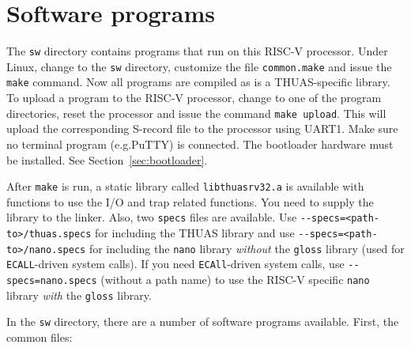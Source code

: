 \documentclass[12pt]{article}
\begin{document}

\section{Software programs}
The \lstinline|sw| directory contains programs that run on this RISC-V processor. Under Linux, change to the \lstinline|sw| directory, customize the file \lstinline|common.make| and issue the \lstinline|make| command. Now all programs are compiled as is a THUAS-specific library. To upload a program to the RISC-V processor, change to one of the program directories, reset the processor and issue the command \lstinline|make upload|. This will upload the corresponding S-record file to the processor using UART1. Make sure no terminal program (e.g.\@ PuTTY) is connected. The bootloader hardware must be installed. See Section~\ref{sec:bootloader}.

After \lstinline|make| is run, a static library called \lstinline|libthuasrv32.a| is available with functions to use the I/O and trap related functions. You need to supply the library to the linker. Also, two \lstinline|specs| files are available. Use \lstinline|--specs=<path-to>/thuas.specs| for including the THUAS library and use \lstinline|--specs=<path-to>/nano.specs| for including the \lstinline|nano| library \textsl{without} the \lstinline|gloss| library (used for \lstinline|ECALL|-driven system calls). If you need \lstinline|ECAll|-driven system calls, use \lstinline|--specs=nano.specs| (without a path name) to use the RISC-V specific \lstinline|nano| library \textsl{with} the \lstinline|gloss| library.

In the \lstinline|sw| directory, there are a number of software programs available. First, the common files:
\end{document}
